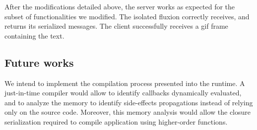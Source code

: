 


After the modifications detailed above, the server works as expected for the subset of functionalities we modified.
The isolated fluxion correctly receives, and returns its serialized messages.
The client successfully receives a gif frame containing the text.

\subsection{Future works}

We intend to implement the compilation process presented into the runtime.
A just-in-time compiler would allow to identify callbacks dynamically evaluated, and to analyze the memory to identify side-effects propagations instead of relying only on the source code.
Moreover, this memory analysis would allow the closure serialization required to compile application using higher-order functions.



